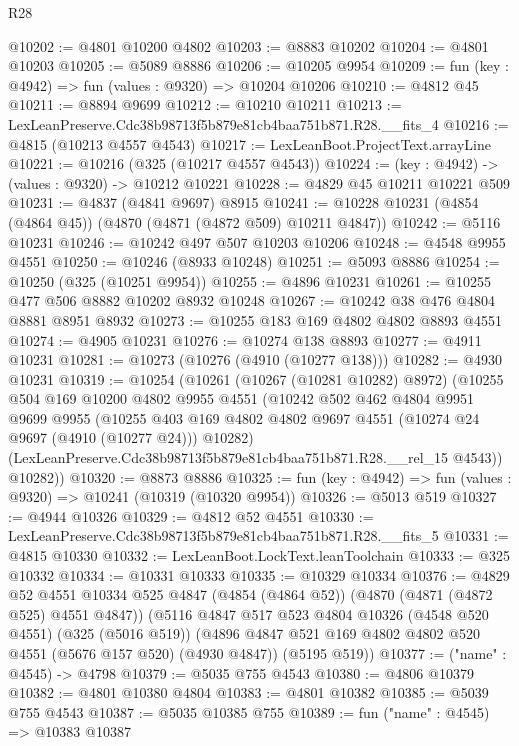 \begin{lexlean}{R28}
\begin{coremodule}
@10202 := @4801 @10200 @4802
@10203 := @8883 @10202
@10204 := @4801 @10203
@10205 := @5089 @8886
@10206 := @10205 @9954
@10209 := fun (key : @4942) => fun (values : @9320) => @10204 @10206
@10210 := @4812 @45
@10211 := @8894 @9699
@10212 := @10210 @10211
@10213 := LexLeanPreserve.Cdc38b98713f5b879e81cb4baa751b871.R28.__fits_4
@10216 := @4815 (@10213 @4557 @4543)
@10217 := LexLeanBoot.ProjectText.arrayLine
@10221 := @10216 (@325 (@10217 @4557 @4543))
@10224 := (key : @4942) -> (values : @9320) -> @10212 @10221
@10228 := @4829 @45 @10211 @10221 @509
@10231 := @4837 (@4841 @9697) @8915
@10241 := @10228 @10231 (@4854 (@4864 @45)) (@4870 (@4871 (@4872 @509) @10211 @4847))
@10242 := @5116 @10231
@10246 := @10242 @497 @507 @10203 @10206
@10248 := @4548 @9955 @4551
@10250 := @10246 (@8933 @10248)
@10251 := @5093 @8886
@10254 := @10250 (@325 (@10251 @9954))
@10255 := @4896 @10231
@10261 := @10255 @477 @506 @8882 @10202 @8932 @10248
@10267 := @10242 @38 @476 @4804 @8881 @8951 @8932
@10273 := @10255 @183 @169 @4802 @4802 @8893 @4551
@10274 := @4905 @10231
@10276 := @10274 @138 @8893
@10277 := @4911 @10231
@10281 := @10273 (@10276 (@4910 (@10277 @138)))
@10282 := @4930 @10231
@10319 := @10254
    (@10261
      (@10267 (@10281 @10282) @8972)
      (@10255
        @504
        @169
        @10200
        @4802
        @9955
        @4551
        (@10242
          @502
          @462
          @4804
          @9951
          @9699
          @9955
          (@10255 @403 @169 @4802 @4802 @9697 @4551 (@10274 @24 @9697 (@4910 (@10277 @24))) @10282)
          (LexLeanPreserve.Cdc38b98713f5b879e81cb4baa751b871.R28.__rel_15 @4543))
        @10282))
@10320 := @8873 @8886
@10325 := fun (key : @4942) => fun (values : @9320) => @10241 (@10319 (@10320 @9954))
@10326 := @5013 @519
@10327 := @4944 @10326
@10329 := @4812 @52 @4551
@10330 := LexLeanPreserve.Cdc38b98713f5b879e81cb4baa751b871.R28.__fits_5
@10331 := @4815 @10330
@10332 := LexLeanBoot.LockText.leanToolchain
@10333 := @325 @10332
@10334 := @10331 @10333
@10335 := @10329 @10334
@10376 := @4829
    @52
    @4551
    @10334
    @525
    @4847
    (@4854 (@4864 @52))
    (@4870 (@4871 (@4872 @525) @4551 @4847))
    (@5116
      @4847
      @517
      @523
      @4804
      @10326
      (@4548 @520 @4551)
      (@325 (@5016 @519))
      (@4896 @4847 @521 @169 @4802 @4802 @520 @4551 (@5676 @157 @520) (@4930 @4847))
      (@5195 @519))
@10377 := ("name" : @4545) -> @4798
@10379 := @5035 @755 @4543
@10380 := @4806 @10379
@10382 := @4801 @10380 @4804
@10383 := @4801 @10382
@10385 := @5039 @755 @4543
@10387 := @5035 @10385 @755
@10389 := fun ("name" : @4545) => @10383 @10387

\end{coremodule}
\end{lexlean}
